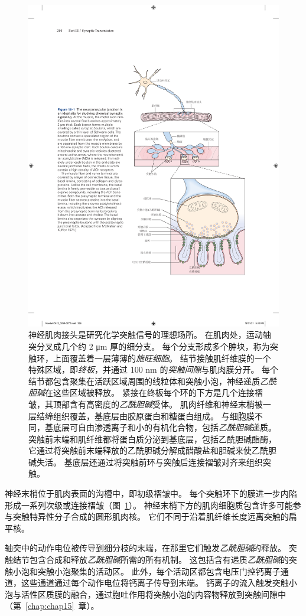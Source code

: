 \begin{figure}[htbp]
	\centering
	\includegraphics[width=0.75\linewidth]{chap12/fig_12_1}
	\caption{神经肌肉接头是研究化学突触信号的理想场所。
		在肌肉处，运动轴突分叉成几个约 2 μm 厚的细分支。
		每个分支形成多个肿块，称为突触环，上面覆盖着一层薄薄的\textit{施旺细胞}。
		结节接触肌纤维膜的一个特殊区域，即\textit{终板}，并通过 100 nm 的\textit{突触间隙}与肌肉膜分开。
		每个结节都包含聚集在活跃区域周围的线粒体和突触小泡，神经递质\textit{乙酰胆碱}在这些区域被释放。
		紧接在终板每个环的下方是几个连接褶皱，其顶部含有高密度的\textit{乙酰胆碱}受体。
		肌肉纤维和神经末梢被一层结缔组织覆盖，基底层由胶原蛋白和糖蛋白组成。
		与细胞膜不同，基底层可自由渗透离子和小的有机化合物，包括\textit{乙酰胆碱}递质。
		突触前末端和肌纤维都将蛋白质分泌到基底层，包括乙酰胆碱酯酶，它通过将突触前末端释放的乙酰胆碱分解成醋酸盐和胆碱来使乙酰胆碱失活。
		基底层还通过将突触前环与突触后连接褶皱对齐来组织突触\cite{mcmahan1971visual}。}
	\label{fig:12_1}
\end{figure}


神经末梢位于肌肉表面的沟槽中，即初级褶皱中。
每个突触环下的膜进一步内陷形成一系列次级或连接褶皱（图~\ref{fig:12_1}）。
神经末梢下方的肌肉细胞质包含许多可能参与突触特异性分子合成的圆形肌肉核。
它们不同于沿着肌纤维长度远离突触的扁平核。


轴突中的动作电位被传导到细分枝的末端，在那里它们触发\textit{乙酰胆碱}的释放。
突触结节包含合成和释放\textit{乙酰胆碱}所需的所有机制。
这包括含有递质\textit{乙酰胆碱}的突触小泡和突触小泡聚集的活动区。
此外，每个活动区都包含电压门控钙离子通道，这些通道通过每个动作电位将钙离子传导到末端。
钙离子的流入触发突触小泡与活性区质膜的融合，通过胞吐作用将突触小泡的内容物释放到突触间隙中（第~\ref{chap:chap15}~章）。


